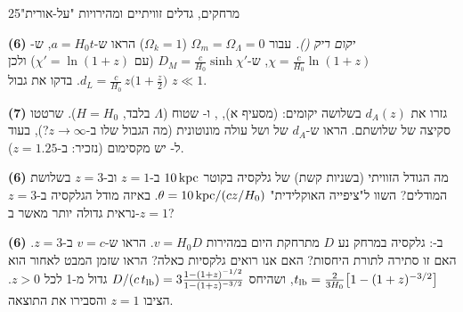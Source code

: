 \documentclass[11pt,a4paper]{article}
\begin{document}
\begin{question}{מרחקים, גדלים זוויתיים ומהירויות "על-אורית"}{25}
\begin{parts}
\item \textbf{(6)} \emph{יקום ריק ().} עבור $\Omega_m=\Omega_\Lambda=0$ ($\Omega_k=1$) הראו ש-$a=H_0t$, ש-$\chi=\frac{c}{H_0}\ln(1+z)$, ש-$D_M=\frac{c}{H_0}\sinh\chi'$ (עם $\chi'=\ln(1+z)$) ולכן
$d_L=\frac{c}{H_0}\,z\big(1+\tfrac z2\big)$. בדקו את גבול $z\ll1$.
\item \textbf{(7)} גזרו את $d_A(z)$ בשלושה יקומים:  (מסעיף א), , ו- שטוח ($\Lambda$ בלבד, $H=H_0$). שרטטו סקיצה של שלושתם. הראו ש-$d_A$ של  ושל  עולה מונוטונית (מה הגבול שלו ב-$z\to\infty$?), בעוד ל- יש מקסימום (נזכיר: ב-$z=1.25$).
\item \textbf{(6)} מה הגודל הזוויתי (בשניות קשת) של גלקסיה בקוטר $10\,\mathrm{kpc}$ ב-$z=1$ וב-$z=3$ בשלושת המודלים? השוו ל"ציפייה האוקלידית" $\theta=10\,\mathrm{kpc}/(cz/H_0)$. באיזה מודל הגלקסיה ב-$z=3$ נראית גדולה יותר מאשר ב-$z=1$?
\item \textbf{(6)} ב-: גלקסיה במרחק נע $D$ מתרחקת היום במהירות $v=H_0D$. הראו ש-$v=c$ ב-$z=3$. האם זו סתירה לתורת היחסות? האם אנו רואים גלקסיות כאלה? הראו שזמן המבט לאחור הוא $t_{\rm lb}=\frac{2}{3H_0}\big[1-(1+z)^{-3/2}\big]$, ושהיחס $D/(c\,t_{\rm lb})=3\frac{1-(1+z)^{-1/2}}{1-(1+z)^{-3/2}}$ גדול מ-1 לכל $z>0$. הציבו $z=1$ והסבירו את התוצאה.
\end{parts}
\end{question}
\end{document}
